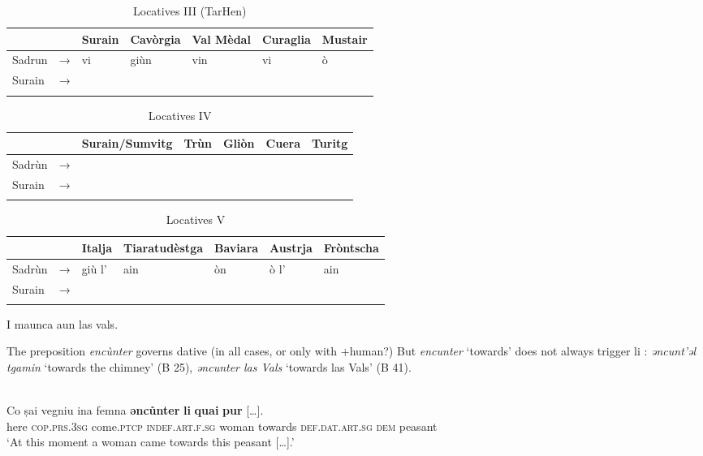 \begin{table}
\caption{Locatives III (TarHen)}
\label{loc3}
 \begin{tabular}{lllllll}
  \lsptoprule
            & & Surain & Cavòrgia & Val Mèdal & Curaglia & Mustair\\ 
  \midrule
  Sadrun  &    →&  vi  & giùn    & vin & vi & ò \\
  Surain  &   → &   &     &   \\
  \lspbottomrule
 \end{tabular}
\end{table}

\begin{table}
\caption{Locatives IV}
\label{locative4}
 \begin{tabular}{lllllll}
  \lsptoprule
            & & Surain/Sumvitg & Trùn & Gliòn & Cuera & Turitg\\ 
  \midrule
  Sadrùn  &    →&  &     &  \\
  Surain  &   → &   &     &   \\
  \lspbottomrule
 \end{tabular}
\end{table}

\begin{table}
\caption{Locatives V}
\label{locative5}
 \begin{tabular}{lllllll}
  \lsptoprule
            & & Italja & Tiaratudèstga  & Baviara & Austrja & Fròntscha\\ 
  \midrule
  Sadrùn  &    →& giù l' &  ain   &  òn & ò l' & ain\\
  Surain  &   → &   &     &   \\
  \lspbottomrule
 \end{tabular}
 \end{table}

I maunca aun las vals.



The preposition \textit{encùnter} governs dative (in all cases, or only with +human?) But \textit{encunter} ‘towards’ does not always trigger li : \textit{ǝncunt’ǝl tgamin} ‘towards the chimney’ (B 25), \textit{ǝncunter las Vals} ‘towards las Vals’ (B 41).

\ea\label{}
\\
\gll Co ṣai	vegniu	ina femna \textbf{əncůnter} \textbf{li}	\textbf{quai} \textbf{pur} […].\\
     here \textsc{cop.prs.3sg} come.\textsc{ptcp} \textsc{indef.art.f.sg} woman towards \textsc{def.dat.art.sg} \textsc{dem} peasant \\
\glt `At this moment a woman came towards this peasant […].'
\z

